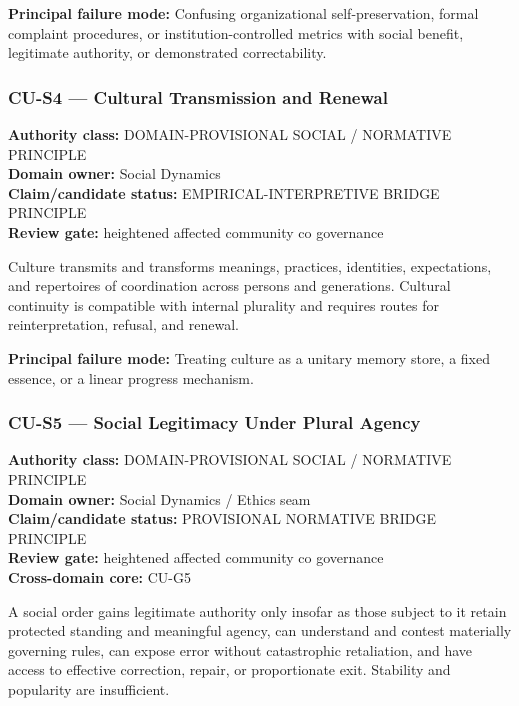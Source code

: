 \documentclass[
  11pt,
]{article}
\begin{document}
\textbf{Principal failure mode:} Confusing organizational
self-preservation, formal complaint procedures, or
institution-controlled metrics with social benefit, legitimate
authority, or demonstrated correctability.

\subsubsection{CU-S4 --- Cultural Transmission and
Renewal}\label{cu-s4-cultural-transmission-and-renewal}

\textbf{Authority class:} DOMAIN-PROVISIONAL SOCIAL / NORMATIVE
PRINCIPLE\\
\textbf{Domain owner:} Social Dynamics\\
\textbf{Claim/candidate status:} EMPIRICAL-INTERPRETIVE BRIDGE
PRINCIPLE\\
\textbf{Review gate:} heightened affected community co governance

Culture transmits and transforms meanings, practices, identities,
expectations, and repertoires of coordination across persons and
generations. Cultural continuity is compatible with internal plurality
and requires routes for reinterpretation, refusal, and renewal.

\textbf{Principal failure mode:} Treating culture as a unitary memory
store, a fixed essence, or a linear progress mechanism.

\subsubsection{CU-S5 --- Social Legitimacy Under Plural
Agency}\label{cu-s5-social-legitimacy-under-plural-agency}

\textbf{Authority class:} DOMAIN-PROVISIONAL SOCIAL / NORMATIVE
PRINCIPLE\\
\textbf{Domain owner:} Social Dynamics / Ethics seam\\
\textbf{Claim/candidate status:} PROVISIONAL NORMATIVE BRIDGE
PRINCIPLE\\
\textbf{Review gate:} heightened affected community co governance\\
\textbf{Cross-domain core:} CU-G5

A social order gains legitimate authority only insofar as those subject
to it retain protected standing and meaningful agency, can understand
and contest materially governing rules, can expose error without
catastrophic retaliation, and have access to effective correction,
repair, or proportionate exit. Stability and popularity are
insufficient.
\end{document}
